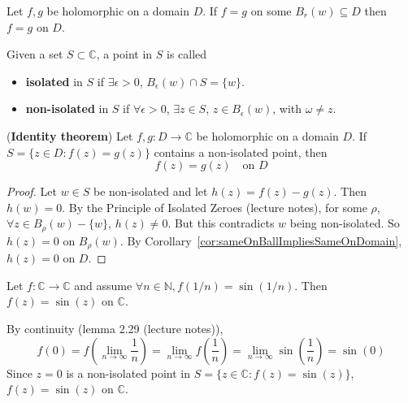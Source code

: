 \begin{corollary}\label{cor:sameOnBallImpliesSameOnDomain}
	Let $f, g$ be holomorphic on a domain $D$. If $f = g$ on some $B_r(w) \subseteq D$ then $f = g$ on $D$.
\end{corollary}

\begin{definition}
	Given a set $S \subset \mathbb{C}$, a point in $S$ is called
	\begin{itemize}
		\item \textbf{isolated} in $S$ if $\exists \epsilon > 0$, $B_{\epsilon}(w) \cap S = \{ w \}$.
		\item \textbf{non-isolated} in $S$ if $\forall \epsilon > 0$, $\exists z \in S$, $z \in B_{\epsilon}(w)$, with $\omega \ne z$.
	\end{itemize}
\end{definition}

\begin{theorem}\label{thm:identityTheorem}
	(\textbf{Identity theorem}) Let $f, g: D \rightarrow \mathbb{C}$ be holomorphic on a domain $D$. If $S = \{ z \in D: f(z) = g(z) \}$ contains a non-isolated point, then
	\[
		f(z) = g(z) \quad \text{on } D
	\]
\end{theorem}

\begin{proof}
	Let $w \in S$ be non-isolated and let $h(z) = f(z) - g(z)$. Then $h(w) = 0$. By the Principle of Isolated Zeroes (lecture notes), for some $\rho$, $\forall z \in B_{\rho} (w) - \{ w \}$, $h(z) \ne 0$. But this contradicts $w$ being non-isolated. So $h(z) = 0$ on $B_{\rho} (w)$. By Corollary~\ref{cor:sameOnBallImpliesSameOnDomain}, $h(z) = 0$ on $D$.
\end{proof}

\begin{example}
	Let $f: \mathbb{C} \rightarrow \mathbb{C}$ and assume $\forall n \in \mathbb{N}, f(1 / n) = \sin(1 / n)$. Then $f(z) = \sin(z)$ on $\mathbb{C}$.

	By continuity (lemma 2.29 (lecture notes)),
	\[
		f(0) = f \left( \lim_{n \rightarrow \infty} \frac{1}{n} \right) = \lim_{n \rightarrow \infty} f \left( \frac{1}{n} \right) = \lim_{n \rightarrow \infty} \sin \left( \frac{1}{n} \right) = \sin(0)
	\]
	Since $z = 0$ is a non-isolated point in $S = \{ z \in \mathbb{C}: f(z) = \sin(z) \}$, $f(z) = \sin(z)$ on $\mathbb{C}$.
\end{example}

